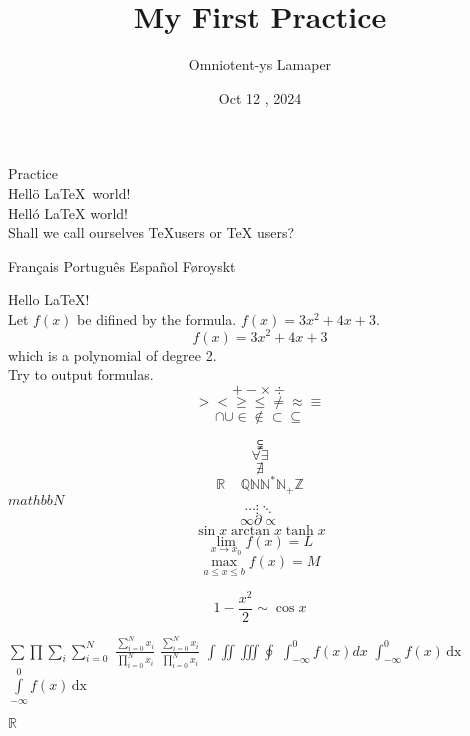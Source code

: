 \documentclass[]{ctexart} %
\title {My First Practice}
\author{Omniotent-ys Lamaper}
\date{Oct 12 , 2024}
\begin{document}
Practice\\
Hell\"o \LaTeX\ world!\\  %
Hell\'o \LaTeX{} world!\\
Shall we call ourselves
\TeX users
or \TeX{} users?



Français Português Español Føroyskt










\maketitle %
Hello \LaTeX!   \\


 Let $f(x)$ be difined by the formula.
 $f (x)=3x^2+4x+3$.
 $$f (x)=3x^2+4x+3$$ 
 which is a polynomial of degree 2.
 $$ $$
 Try to output formulas.
$$+ - \times \div$$
$$> < \ge \le \ne \approx \equiv$$
$$\cap \cup \in \notin \subset \subseteq$$  

$$ \subsetneqq $$
$$\forall \exists $$  
$$\nexists$$
$$\mathbb{R}~~~~~\mathbb{Q} \mathbb{N} \mathbb{N^*} \mathbb{N_+} \mathbb{Z}$$
$ mathbb{N} $
$$\cdots \vdots \ddots$$
$$\infty \partial \propto $$
$$\sin x   \arctan x   \tanh x$$
$$\lim\limits_{x \to x_0}f(x)=L$$
$$\max\limits_{a \le x \le b}{f(x)}=M$$

$$1 - \frac{x^2}{2} \sim \cos x$$


$\sum$\quad $\prod$\quad $\sum_i$\quad $\sum_{i=0}^N$
 \quad $\frac{\sum_{i=0}^N x_i}{\prod_{i=0}^N x_i}$
 \quad $\frac{\sum\limits_{i=0}^N x_i}{\prod\limits_{i
 =0}^N x_i}$
$\int$\quad $\iint$\quad $\iiint$\quad $\oint$
 \quad $\int_{−\infty}^0 f (x)d{x}$
 \quad $\int_{−\infty}^0 f (x) \, \textrm{d{x}}$
 \quad $\int\limits_{−\infty}^0 f (x) \, \textrm{d{x}}$


$ \mathbb{R} $
\end{document}
